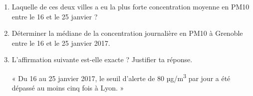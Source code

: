 \documentclass[a4paper]{book}
\begin{document}
{\begin{exercice}
        \begin{enumerate}
            \item Laquelle de ces deux villes a eu la plus forte concentration moyenne en PM10 entre le 16 et le 25 janvier ?   
        
            \item Déterminer la médiane de la concentration journalière en PM10 à Grenoble entre le 16 et le 25 janvier 2017.
        
            \item L'affirmation suivante est-elle exacte ? Justifier ta réponse.
        
            « Du 16 au 25 janvier 2017, le seuil d'alerte de 80 µg/m\textsuperscript{3} par jour a été dépassé au moins cinq fois à Lyon. »
        \end{enumerate}
    \end{exercice}
}
\end{document}
